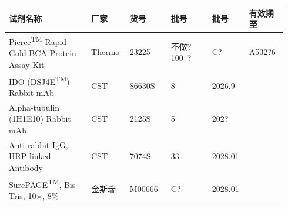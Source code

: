 \documentclass[UTF8,10pt,a4paper,fontset=fandol]{ctexart}
\newcommand{\fieldvalue}[1]{#1}
\newcommand{\handwritten}[1]{#1}
\begin{document}
\begin{center}
\scriptsize
\begin{tabular}{|p{0.29\linewidth}|p{0.13\linewidth}|p{0.14\linewidth}|p{0.14\linewidth}|p{0.11\linewidth}|p{0.13\linewidth}|}
\hline
试剂名称 & 厂家 & 货号 & 批号 & 批号 & 有效期至\\
\hline
Pierce\textsuperscript{TM} Rapid Gold BCA Protein Assay Kit &
Thermo & 23225 &
\fieldvalue{\handwritten{不做? 100--?}} &
\fieldvalue{\handwritten{C?}} &
\fieldvalue{\handwritten{A532?6}}\\
\hline
IDO (DSJ4E\textsuperscript{TM}) Rabbit mAb & CST & 86630S & 
\fieldvalue{\handwritten{8}} &
\fieldvalue{\handwritten{2026.9}} & \\
\hline
Alpha-tubulin (1H1E10) Rabbit mAb & CST & 2125S &
\fieldvalue{\handwritten{5}} &
\fieldvalue{\handwritten{202?}} & \\
\hline
Anti-rabbit IgG, HRP-linked Antibody & CST & 7074S &
\fieldvalue{\handwritten{33}} &
\fieldvalue{\handwritten{2028.01}} & \\
\hline
SurePAGE\textsuperscript{TM}, Bis-Tris, 10$\times$, 8\% & 金斯瑞 & M00666 &
\fieldvalue{\handwritten{C?}} &
\fieldvalue{\handwritten{2028.01}} & \\

\end{tabular}
\end{center}
\end{document}
